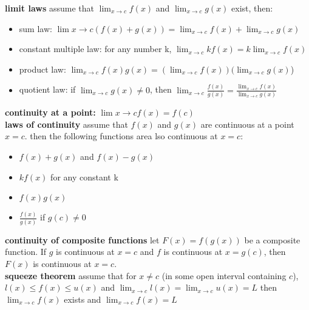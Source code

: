 \documentclass{article}
\begin{document}
\textbf{limit laws} assume that $\lim_{x \to c}f(x)$ and $\lim_{x \to c}g(x)$ exist, then:
	\begin{itemize}
		\item sum law: $\lim{x \to c}(f(x) + g(x)) = \lim_{x \to c}f(x) + \lim_{x \to c}g(x)$
		\item constant multiple law: for any number k, $\lim_{x \to c}kf(x) = k\lim_{x \to c}f(x)$
		\item product law: $\lim_{x \to c}f(x)g(x) = (\lim_{x \to c}f(x))(\lim_{x \to c}g(x)$)
		\item quotient law: if $\lim_{x \to c}g(x) \neq 0$, then $\lim_{x \to c}\frac{f(x)}{g(x)} = \frac{\lim_{x \to c}f(x)}{\lim_{x \to c}g(x)}$
	\end{itemize}

\textbf{continuity at a point:} $\lim{x \to c}f(x) = f(c)$\\

\textbf{laws of continuity} assume that $f(x)$ and $g(x)$ are continuous at a point $x = c$. then the following functions area lso continuous at $x = c$:
	\begin{itemize}
		\item $f(x) + g(x)$ and $f(x) - g(x)$
		\item $kf(x)$ for any constant k
		\item $f(x)g(x)$
		\item $\frac{f(x)}{g(x)}$ if $g(c) \neq 0$
	\end{itemize}

\textbf{continuity of composite functions} let $F(x) = f(g(x))$ be a composite function. If $g$ is continuous at $x = c$ and $f$ is continuous at $x = g(c)$, then $F(x)$ is continuous at $x = c$.\\

\textbf{squeeze theorem} assume that for $x \neq c$ (in some open interval containing $c$), $l(x) \leq f(x) \leq u(x)$ and $\lim_{x \to c}l(x) = \lim_{x \to c}u(x) = L$ then $\lim_{x \to c}f(x)$ exists and $\lim_{x \to c}f(x) = L$\\
\end{document}
